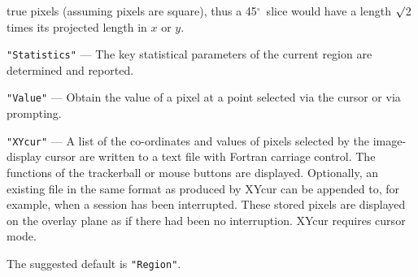 \documentclass[twoside,11pt]{article}
\newcommand{\dgs}{\hbox{$^\circ$}}
\newcommand{\dgs}{{\rawhtml &deg;}}
\begin{document}
{{{\begin{description}
                          true pixels (assuming pixels are square), thus
                          a 45\dgs\ slice would have a length $\surd$2
                          times its projected length in $x$ or $y$.
         \item {\tt "Statistics"} --- The key statistical parameters of the current
                          region are determined and reported.
         \item {\tt "Value"} --- Obtain the value of a pixel at a point selected
                          via the cursor or via prompting.
         \item {\tt "XYcur"} --- A list of the co-ordinates and values of pixels
                          selected by the image-display cursor are
                          written to a text file with Fortran carriage
                          control. The functions of the trackerball or
                          mouse buttons are displayed.  Optionally, an
                          existing file in the same format as produced
                          by XYcur can be appended to, for example, when
                          a session has been interrupted.  These stored
                          pixels are displayed on the overlay plane as
                          if there had been no interruption.  XYcur
                          requires cursor mode.
         \end{description}
         The suggested default is {\tt "Region"}.

}}}
\end{document}

